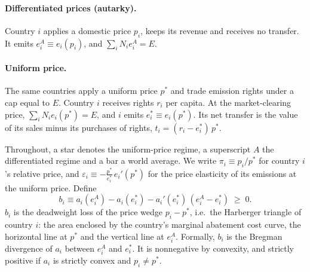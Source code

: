 \documentclass[12pt,english]{article}
\theoremstyle{remark}
\begin{document}
\paragraph{Differentiated prices (autarky).} Country $i$ applies a domestic price $p_i$, keeps its revenue and receives no transfer. It emits $e^A_i \equiv e_i(p_i)$, and $\sum_i N_i e^A_i = E$.

\paragraph{Uniform price.} The same countries apply a uniform price $p^*$ and trade emission rights under a cap equal to $E$.
Country $i$ receives rights $r_i$ per capita. At the market-clearing price, $\sum_i N_i e_i(p^*) = E$,
and $i$ emits $e^*_i \equiv e_i(p^*)$. Its net transfer is the value of its sales minus its purchases of rights, $t_i=(r_i-e^*_i)\,p^*$.

Throughout, a star denotes the uniform-price regime, a superscript $A$ the differentiated regime and a bar a world average.
We write $\pi_i \equiv p_i/p^*$ for country $i$'s relative price, and $\varepsilon_i \equiv -\frac{p^*}{e^*_i}\,e_i'(p^*)$ for the price elasticity of its emissions at the uniform price. Define
\begin{equation}
  b_i \equiv a_i(e^A_i) - a_i(e^*_i) - a_i'(e^*_i)\,(e^A_i-e^*_i) \;\geq\; 0.
  \label{eq:bregman}
\end{equation}
$b_i$ is the deadweight loss of the price wedge $p_i - p^*$, i.e.\ the Harberger triangle of country $i$: %
the area enclosed by the country's marginal abatement cost curve, the horizontal line at $p^*$ and the vertical line at $e^A_i$. %
Formally, $b_i$ is the Bregman divergence of $a_i$ between $e^A_i$ and $e^*_i$. It is nonnegative by convexity, and strictly positive if $a_i$ is strictly convex and $p_i\neq p^*$.
\end{document}
